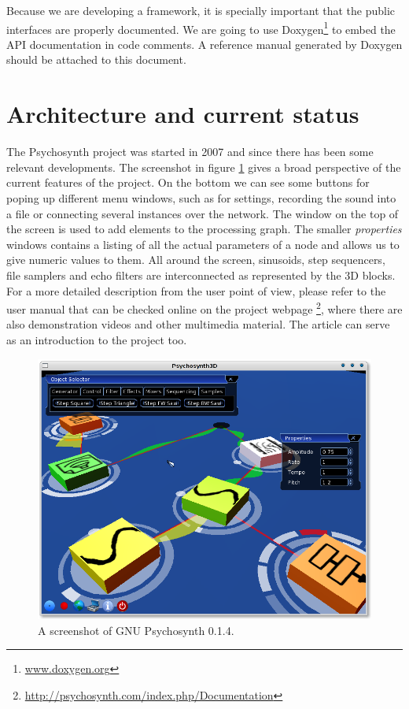 Because we are developing a framework, it is specially important that
the public interfaces are properly documented. We are going to use
Doxygen\footnote{\url{www.doxygen.org}} to embed the API documentation
in code comments. A reference manual generated by Doxygen should be
attached to this document.

\section{Architecture and current status}

The Psychosynth project was started in 2007 and since there has been
some relevant developments. The screenshot in figure
\ref{fig:screenie} gives a broad perspective of the current features
of the project. On the bottom we can see some buttons for poping up
different menu windows, such as for settings, recording the sound into
a file or connecting several instances over the network. The window on
the top of the screen is used to add elements to the processing
graph. The smaller \emph{properties} windows contains a listing of all
the actual parameters of a node and allows us to give numeric values
to them. All around the screen, sinusoids, step sequencers, file
samplers and echo filters are interconnected as represented by the 3D
blocks.  For a more detailed description from the user point of view,
please refer to the user manual that can be checked online on the
project webpage
\footnote{\url{http://psychosynth.com/index.php/Documentation}}, where
there are also demonstration videos and other multimedia material. The
article \cite{bolivar08psychosynth} can serve as an introduction to
the project too.

\begin{figure}[h!]
  \centering
  \includegraphics[width=\textwidth]{pic/screenie.png}
  \caption[A screenshot of GNU Psychosynth 0.1.4]{A screenshot of GNU
    Psychosynth 0.1.4.}
  \label{fig:screenie}
\end{figure}

